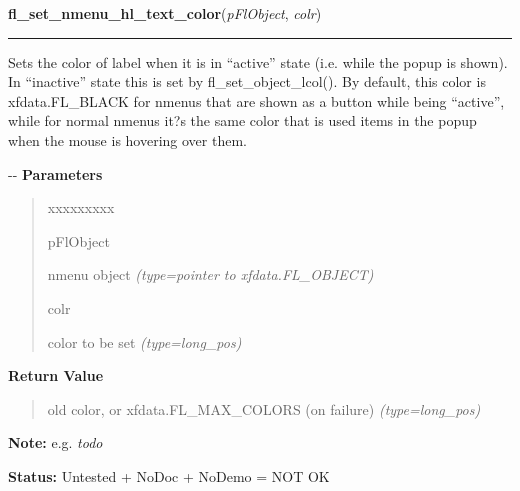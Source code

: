     \label{xformslib:flnmenu:fl_set_nmenu_hl_text_color}

    \vspace{0.5ex}

\hspace{.8\funcindent}\begin{boxedminipage}{\funcwidth}

    \raggedright \textbf{fl\_set\_nmenu\_hl\_text\_color}(\textit{pFlObject}, \textit{colr})

    \vspace{-1.5ex}

    \rule{\textwidth}{0.5\fboxrule}
\setlength{\parskip}{2ex}

Sets the color of label when it is in ``active'' state (i.e. while the
popup is shown). In ``inactive'' state this is set by fl\_set\_object\_lcol().
By default, this color is xfdata.FL\_BLACK for nmenus that are shown as a
button while being ``active'', while for normal nmenus it?s the same color
that is used items in the popup when the mouse is hovering over them.

-{}-
\setlength{\parskip}{1ex}
      \textbf{Parameters}
      \vspace{-1ex}

      \begin{quote}
        \begin{Ventry}{xxxxxxxxx}

          \item[pFlObject]


nmenu object
            {\it (type=pointer to xfdata.FL\_OBJECT)}

          \item[colr]


color to be set
            {\it (type=long\_pos)}

        \end{Ventry}

      \end{quote}

      \textbf{Return Value}
    \vspace{-1ex}

      \begin{quote}

old color, or xfdata.FL\_MAX\_COLORS (on failure)
      {\it (type=long\_pos)}

      \end{quote}

\textbf{Note:} 
e.g. \emph{todo}


\textbf{Status:} 
Untested + NoDoc + NoDemo = NOT OK


    \end{boxedminipage}


